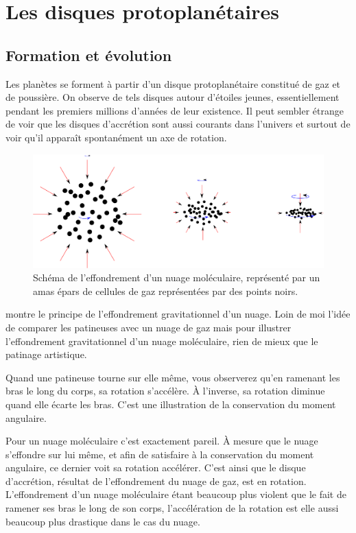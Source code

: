  \section{Les disques protoplanétaires}


\subsection{Formation et évolution}
Les planètes se forment à partir d'un disque protoplanétaire constitué de gaz et de poussière. On observe de tels disques autour d'étoiles jeunes, essentiellement pendant les premiers millions d'années de leur existence. Il peut sembler étrange de voir que les disques d'accrétion sont aussi courants dans l'univers et surtout de voir qu'il apparaît spontanément un axe de rotation. 

\begin{figure}[htb]
\centering
\includegraphics[width=0.8\linewidth]{figure/disk_collapse.pdf}
\caption{Schéma de l'effondrement d'un nuage moléculaire, représenté par un amas épars de cellules de gaz représentées par des points noirs.}\label{fig:disk_collapse}
\end{figure}

 montre le principe de l'effondrement gravitationnel d'un nuage. Loin de moi l'idée de comparer les patineuses avec un nuage de gaz mais pour illustrer l'effondrement gravitationnel d'un nuage moléculaire, rien de mieux que le patinage artistique. 

Quand une patineuse tourne sur elle même, vous observerez qu'en ramenant les bras le long du corps, sa rotation s'accélère. À l'inverse, sa rotation diminue quand elle écarte les bras. C'est une illustration de la conservation du moment angulaire. 

Pour un nuage moléculaire c'est exactement pareil. À mesure que le nuage s'effondre sur lui même, et afin de satisfaire à la conservation du moment angulaire, ce dernier voit sa rotation accélérer. C'est ainsi que le disque d'accrétion, résultat de l'effondrement du nuage de gaz, est en rotation. L'effondrement d'un nuage moléculaire étant beaucoup plus violent que le fait de ramener ses bras le long de son corps, l'accélération de la rotation est elle aussi beaucoup plus drastique dans le cas du nuage. 

